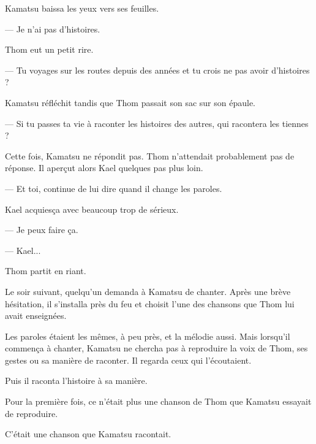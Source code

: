 Kamatsu baissa les yeux vers ses feuilles.

— Je n'ai pas d'histoires.

Thom eut un petit rire.

— Tu voyages sur les routes depuis des années et tu crois ne pas avoir
d'histoires ?

Kamatsu réfléchit tandis que Thom passait son sac sur son épaule.

— Si tu passes ta vie à raconter les histoires des autres, qui racontera les
tiennes ?

Cette fois, Kamatsu ne répondit pas. Thom n'attendait probablement pas de
réponse. Il aperçut alors Kael quelques pas plus loin.

— Et toi, continue de lui dire quand il change les paroles.

Kael acquiesça avec beaucoup trop de sérieux.

— Je peux faire ça.

— Kael...

Thom partit en riant.

\scenebreak

Le soir suivant, quelqu'un demanda à Kamatsu de chanter. Après une brève
hésitation, il s'installa près du feu et choisit l'une des chansons que Thom
lui avait enseignées.

Les paroles étaient les mêmes, à peu près, et la mélodie aussi. Mais lorsqu'il
commença à chanter, Kamatsu ne chercha pas à reproduire la voix de Thom, ses
gestes ou sa manière de raconter. Il regarda ceux qui l'écoutaient.

Puis il raconta l'histoire à sa manière.

Pour la première fois, ce n'était plus une chanson de Thom que Kamatsu essayait
de reproduire.

C'était une chanson que Kamatsu racontait.